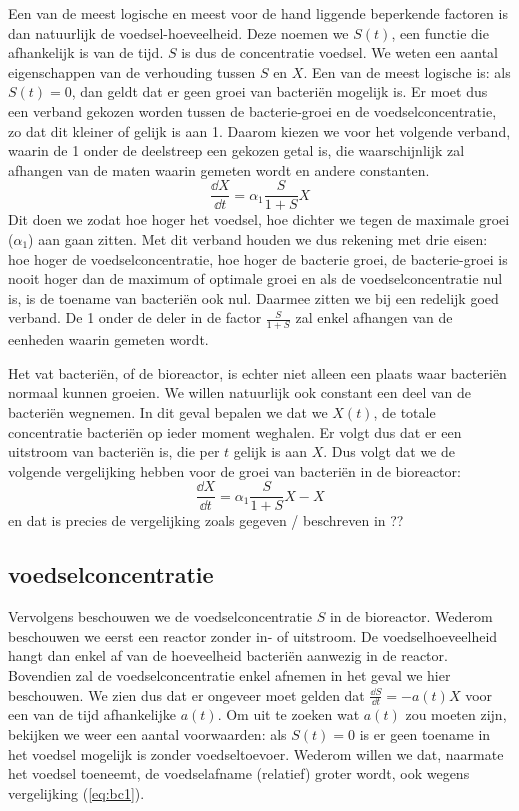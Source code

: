 Een van de meest logische en meest voor de hand liggende beperkende factoren is dan natuurlijk de voedsel-hoeveelheid. Deze noemen we $S(t)$, een functie die afhankelijk is van de tijd. $S$ is dus de concentratie voedsel. We weten een aantal eigenschappen van de verhouding tussen $S$ en $X$. Een van de meest logische is: als $S(t) = 0$, dan geldt dat er geen groei van bacteri\"en mogelijk is. Er moet dus een verband gekozen worden tussen de bacterie-groei en de voedselconcentratie, zo dat dit kleiner of gelijk is aan 1. Daarom kiezen we voor het volgende verband, waarin de 1 onder de deelstreep een gekozen getal is, die waarschijnlijk zal afhangen van de maten waarin gemeten wordt en andere constanten.
\begin{equation*}
	\frac{\dd X} {\dd t} = \alpha_1 \frac{S}{1 + S} X
\end{equation*}
Dit doen we zodat hoe hoger het voedsel, hoe dichter we tegen de maximale groei ($\alpha_1$) aan gaan zitten. Met dit verband houden we dus rekening met drie eisen: hoe hoger de voedselconcentratie, hoe hoger de bacterie groei, de bacterie-groei is nooit hoger dan de maximum of optimale groei en als de voedselconcentratie nul is, is de toename van bacteri\"en ook nul. Daarmee zitten we bij een redelijk goed verband. De 1 onder de deler in de factor $\frac{S}{1+S}$ zal enkel afhangen van de eenheden waarin gemeten wordt. 

Het vat bacteri\"en, of de bioreactor, is echter niet alleen een plaats waar bacteri\"en normaal kunnen groeien. We willen natuurlijk ook constant een deel van de bacteri\"en wegnemen. In dit geval bepalen we dat we $X(t)$, de totale concentratie bacteri\"en op ieder moment weghalen. Er volgt dus dat er een uitstroom van bacteri\"en is, die per $t$ gelijk is aan $X$. Dus volgt dat we de volgende vergelijking hebben voor de groei van bacteri\"en in de bioreactor:
\begin{equation}
	\frac{\dd X}{\dd t} = \alpha_1 \frac{S}{1+S} X - X 		\label{eq:bc1}
\end{equation}
en dat is precies de vergelijking zoals gegeven / beschreven in ??%

\subsection*{voedselconcentratie}
Vervolgens beschouwen we de voedselconcentratie $S$ in de bioreactor. Wederom beschouwen we eerst een reactor zonder in- of uitstroom. De voedselhoeveelheid hangt dan enkel af van de hoeveelheid bacteri\"en aanwezig in de reactor. Bovendien zal de voedselconcentratie enkel afnemen in het geval we hier beschouwen. We zien dus dat er ongeveer moet gelden dat $\tfrac{\dd S}{\dd t} = - a(t) X$ voor een van de tijd afhankelijke $a(t)$. Om uit te zoeken wat $a(t)$ zou moeten zijn, bekijken we weer een aantal voorwaarden: als $S(t) = 0$ is er geen toename in het voedsel mogelijk is zonder voedseltoevoer. Wederom willen we dat, naarmate het voedsel toeneemt, de voedselafname (relatief) groter wordt, ook wegens vergelijking (\ref{eq:bc1}). 

